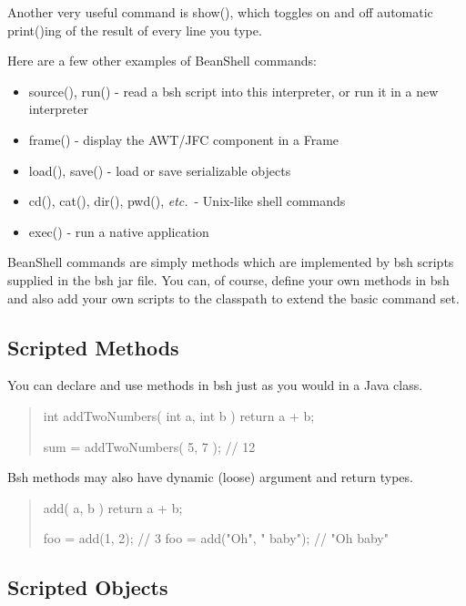 \documentclass[twoside,11pt,nolof]{starlink}
\providecommand{\etc}{\textit{etc.}}
\begin{document}
Another very useful command is show(), which toggles on and off
automatic print()ing of the result of every line you type.

Here are a few other examples of BeanShell commands:
\begin{itemize}
 \item source(), run() - read a bsh script into this interpreter, or
       run it in a new interpreter
 \item frame() - display the AWT/JFC component in a Frame
 \item load(), save() - load or save serializable objects
 \item cd(), cat(), dir(), pwd(), \etc\  - Unix-like shell commands
 \item exec() - run a native application
\end{itemize}

BeanShell commands are simply methods which are implemented by bsh scripts
supplied in the bsh jar file.  You can, of course, define your own methods
in bsh and also add your own scripts to the classpath to extend the basic
command set.

\subsection{Scripted Methods}

You can declare and use methods in bsh just as you would in a Java class.
\begin{quote}
\begin{terminalv}
    int addTwoNumbers( int a, int b ) {
        return a + b;
    }

    sum = addTwoNumbers( 5, 7 );  // 12
\end{terminalv}
\end{quote}
Bsh methods may also have dynamic (loose) argument and return types.
\begin{quote}
\begin{terminalv}
    add( a, b ) {
        return a + b;
    }

    foo = add(1, 2);            // 3
    foo = add("Oh", " baby");   // "Oh baby"
\end{terminalv}
\end{quote}

\subsection{Scripted Objects}
\end{document}
